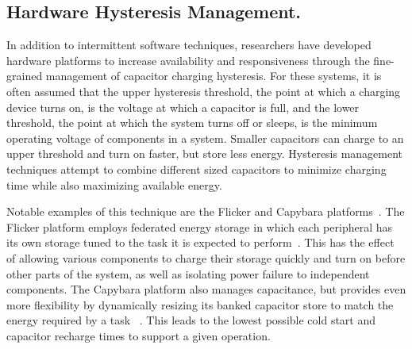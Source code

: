 

\subsection{Hardware Hysteresis Management.}
In addition to intermittent software techniques, researchers have developed
hardware platforms to
increase availability and responsiveness through the fine-grained management
of capacitor charging hysteresis.
For these systems,
it is often assumed that the upper hysteresis threshold, the point at which a
charging device turns on, is the voltage at which a capacitor is full, and the
lower threshold, the point at which the system turns off or sleeps, is the minimum
operating voltage of components in a system.
Smaller capacitors can charge to an upper
threshold and turn on faster, but store less energy.  Hysteresis management
techniques attempt to combine different sized capacitors to
minimize charging time while also maximizing available energy.

Notable examples of this technique are the Flicker and Capybara platforms~\cite{hesterFlicker17, colinReconfigurable18}.
The Flicker
platform employs federated
energy storage in which each peripheral has its own storage tuned to the task
it is expected to perform~\cite{hesterTragedy15,hesterFlicker17}. This has the
effect of allowing various components to charge their storage quickly and turn on before other parts of the system, as well
as isolating power failure to independent components.
The Capybara platform also manages capacitance,
but provides even more flexibility by dynamically resizing its banked
capacitor store to match the energy required by a task
~\cite{colinReconfigurable18}. This leads to the lowest possible cold start and capacitor recharge times to support a given operation.

